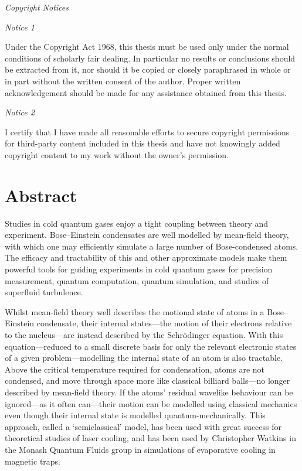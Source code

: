 \begin{center}
\begin{minipage}{0.95\textwidth}

\begin{center}
\textit{Copyright Notices}
\end{center}

{\textit{Notice 1}}

Under the Copyright Act 1968, this thesis must be used only under the normal conditions of scholarly fair dealing.
In particular no results or conclusions should be extracted from it, nor should it be copied or closely paraphrased in whole or in part without the written consent of the author.
Proper written acknowledgement should be made for any assistance obtained from this thesis.

\bigskip

{\textit {Notice 2}}

I certify that I have made all reasonable efforts to secure copyright permissions for third-party content included in this thesis and have not knowingly added copyright content to my work without the owner's permission.

\end{minipage}
\end{center}

\vspace*{\fill}
\vspace*{\fill}

\chapter*{Abstract}

Studies in cold quantum gases enjoy a tight coupling between theory and experiment. Bose--Einstein condensates are well modelled by mean-field theory, with which one may efficiently simulate a large number of Bose-condensed atoms. The efficacy and tractability of this and other approximate models make them powerful tools for guiding experiments in cold quantum gases for precision measurement, quantum computation, quantum simulation, and studies of superfluid turbulence.

Whilst mean-field theory well describes the motional state of atoms in a Bose--Einstein condensate, their internal states---the motion of their electrons relative to the nucleus---are instead described by the Schr\"odinger equation. With this equation---reduced to a small discrete basis for only the relevant electronic states of a given problem---modelling the internal state of an atom is also tractable. Above the critical temperature required for condensation, atoms are not condensed, and move through space more like classical billiard balls---no longer described by mean-field theory. If the atoms' residual wavelike behaviour can be ignored---as it often can---their motion can be modelled using classical mechanics even though their internal state is modelled quantum-mechanically. This approach, called a `semiclassical' model, has been used with great success for theoretical studies of laser cooling, and has been used by Christopher Watkins in the Monash Quantum Fluids group in simulations of evaporative cooling in magnetic traps.

